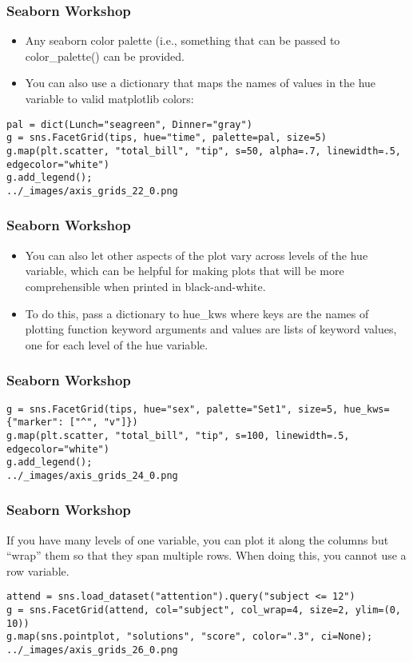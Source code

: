 \documentclass{beamer}
\begin{document}
\begin{frame}[fragile]
\frametitle{Seaborn Workshop}
\large
\begin{itemize}
\item Any seaborn color palette (i.e., something that can be passed to color\_palette() can be provided. 
\item You can also use a dictionary that maps the names of values in the hue variable to valid matplotlib colors:
\end{itemize}

\begin{verbatim}
pal = dict(Lunch="seagreen", Dinner="gray")
g = sns.FacetGrid(tips, hue="time", palette=pal, size=5)
g.map(plt.scatter, "total_bill", "tip", s=50, alpha=.7, linewidth=.5, edgecolor="white")
g.add_legend();
../_images/axis_grids_22_0.png
\end{verbatim}
\end{frame}
\begin{frame}[fragile]
\frametitle{Seaborn Workshop}
\large
\begin{itemize}
\item You can also let other aspects of the plot vary across levels of the hue variable, which can be helpful for making plots that will be more comprehensible when printed in black-and-white. 
\item To do this, pass a dictionary to hue\_kws where keys are the names of plotting function keyword arguments and values are lists of keyword values, one for each level of the hue variable.
\end{itemize}

\end{frame}
\begin{frame}[fragile]
\frametitle{Seaborn Workshop}
\large
\begin{verbatim}
g = sns.FacetGrid(tips, hue="sex", palette="Set1", size=5, hue_kws={"marker": ["^", "v"]})
g.map(plt.scatter, "total_bill", "tip", s=100, linewidth=.5, edgecolor="white")
g.add_legend();
../_images/axis_grids_24_0.png
\end{verbatim}
\end{frame}
\begin{frame}[fragile]
\frametitle{Seaborn Workshop}
\large
If you have many levels of one variable, you can plot it along the columns but “wrap” them so that they span multiple rows. When doing this, you cannot use a row variable.

\begin{verbatim}
attend = sns.load_dataset("attention").query("subject <= 12")
g = sns.FacetGrid(attend, col="subject", col_wrap=4, size=2, ylim=(0, 10))
g.map(sns.pointplot, "solutions", "score", color=".3", ci=None);
../_images/axis_grids_26_0.png
\end{verbatim}
\end{frame}
\end{document}
